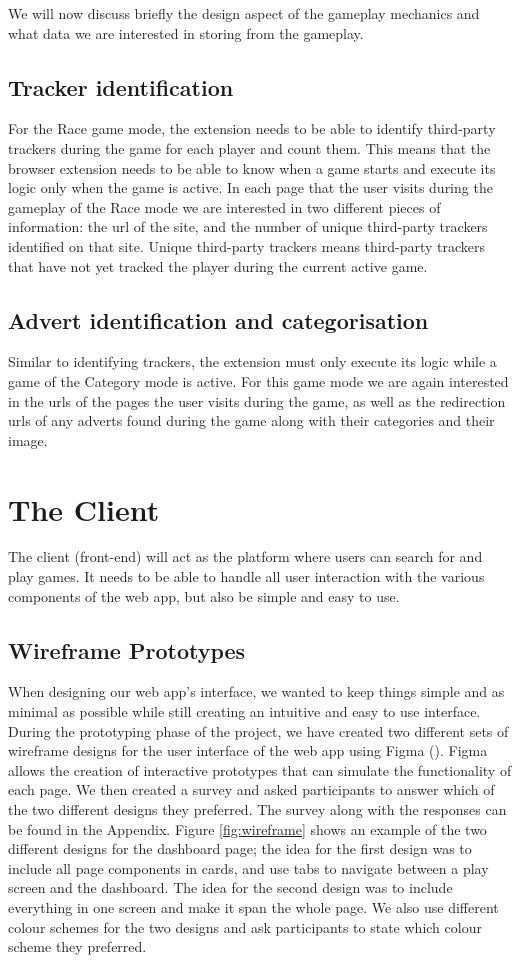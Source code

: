 \documentclass{l4proj}
\begin{document}
We will now discuss briefly the design aspect of the gameplay mechanics and what data we are interested in storing from the gameplay.

\subsection{Tracker identification}
For the Race game mode, the extension needs to be able to identify third-party trackers during the game for each player and count them. This means that the browser extension needs to be able to know when a game starts and execute its logic only when the game is active. In each page that the user visits during the gameplay of the Race mode we are interested in two different pieces of information: the url of the site, and the number of unique third-party trackers identified on that site. Unique third-party trackers means third-party trackers that have not yet tracked the player during the current active game.

\subsection{Advert identification and categorisation}
Similar to identifying trackers, the extension must only execute its logic while a game of the Category mode is active. For this game mode we are again interested in the urls of the pages the user visits during the game, as well as the redirection urls of any adverts found during the game along with their categories and their image. 

\section{The Client}
The client (front-end) will act as the platform where users can search for and play games. It needs to be able to handle all user interaction with the various components of the web app, but also be simple and easy to use.

\subsection{Wireframe Prototypes}
When designing our web app's interface, we wanted to keep things simple and as minimal as possible while still creating an intuitive and easy to use interface. During the prototyping phase of the project, we have created two different sets of wireframe designs for the user interface of the web app using Figma (\cite{figma}). Figma allows the creation of interactive prototypes that can simulate the functionality of each page. We then created a survey and asked participants to answer which of the two different designs they preferred. The survey along with the responses can be found in the Appendix. Figure \ref{fig:wireframe} shows an example of the two different designs for the dashboard page; the idea for the first design was to include all page components in cards, and use tabs to navigate between a play screen and the dashboard. The idea for the second design was to include everything in one screen and make it span the whole page. We also use different colour schemes for the two designs and ask participants to state which colour scheme they preferred.
\end{document}

